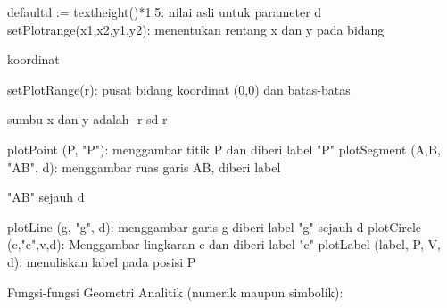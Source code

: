 \documentclass[a4paper,10pt]{article}
\begin{document}
\begin{eulernotebook}
\begin{eulercomment}
\begin{eulercomment}
\begin{eulercomment}
\end{eulercomment}
\begin{eulerttcomment}
  defaultd := textheight()*1.5: nilai asli untuk parameter d
  setPlotrange(x1,x2,y1,y2): menentukan rentang x dan y pada bidang
\end{eulerttcomment}
\begin{eulercomment}
koordinat\\
\end{eulercomment}
\begin{eulerttcomment}
  setPlotRange(r): pusat bidang koordinat (0,0) dan batas-batas
\end{eulerttcomment}
\begin{eulercomment}
sumbu-x dan y adalah -r sd r\\
\end{eulercomment}
\begin{eulerttcomment}
  plotPoint (P, "P"): menggambar titik P dan diberi label "P"
  plotSegment (A,B, "AB", d): menggambar ruas garis AB, diberi label
\end{eulerttcomment}
\begin{eulercomment}
"AB" sejauh d\\
\end{eulercomment}
\begin{eulerttcomment}
  plotLine (g, "g", d): menggambar garis g diberi label "g" sejauh d
  plotCircle (c,"c",v,d): Menggambar lingkaran c dan diberi label "c"
  plotLabel (label, P, V, d): menuliskan label pada posisi P
\end{eulerttcomment}
\begin{eulercomment}

Fungsi-fungsi Geometri Analitik (numerik maupun simbolik):


\end{eulercomment}
\end{eulercomment}
\end{eulercomment}
\end{eulernotebook}
\end{document}
